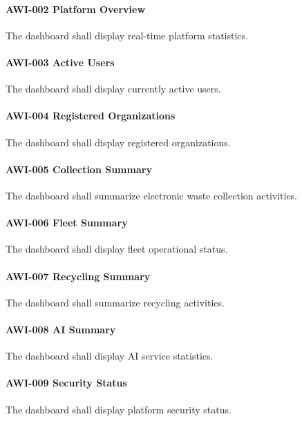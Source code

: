 \paragraph{AWI-002 Platform Overview}

The dashboard shall display real-time platform statistics.

\paragraph{AWI-003 Active Users}

The dashboard shall display currently active users.

\paragraph{AWI-004 Registered Organizations}

The dashboard shall display registered organizations.

\paragraph{AWI-005 Collection Summary}

The dashboard shall summarize electronic waste collection activities.

\paragraph{AWI-006 Fleet Summary}

The dashboard shall display fleet operational status.

\paragraph{AWI-007 Recycling Summary}

The dashboard shall summarize recycling activities.

\paragraph{AWI-008 AI Summary}

The dashboard shall display AI service statistics.

\paragraph{AWI-009 Security Status}

The dashboard shall display platform security status.

